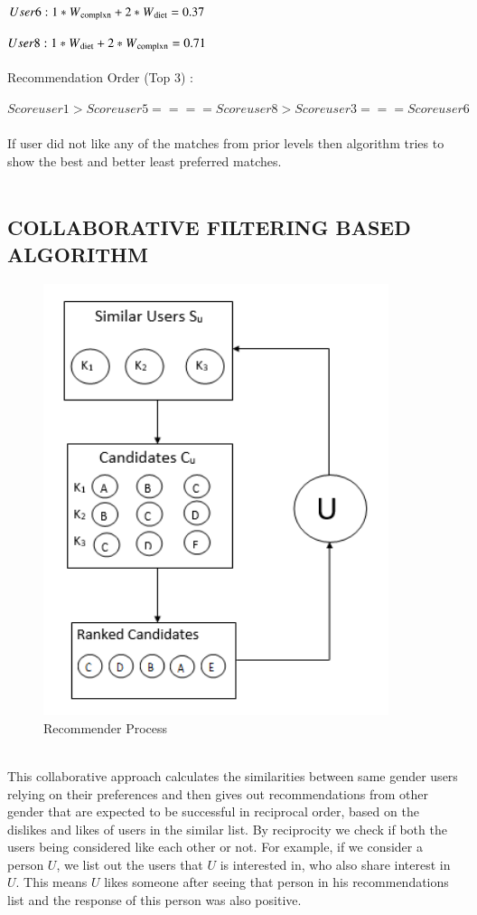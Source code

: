 \documentclass[12pt,oneside]{book}
\begin{document}
$User 6 : 1* W\textsubscript{complxn} + 2 * W\textsubscript{diet} = 0.37$

$User 8 : 1* W\textsubscript{diet} + 2 * W\textsubscript{complxn} = 0.71$\\\\
Recommendation Order (Top 3) :

$Scoreuser1 > Scoreuser5 ==== Scoreuser8  > Scoreuser3 === Scoreuser6$\\\\
If user did not like any of the matches from prior levels then algorithm tries to show the best and better least preferred matches. \\\\
\subsection{COLLABORATIVE FILTERING BASED ALGORITHM}
\begin{figure}[h]
    \centering
    \includegraphics[width=0.9\textwidth]{cfa}
    \caption{Recommender Process}
    \label{fig:cfa}
\end{figure}\\
This collaborative approach calculates the similarities between same gender users relying on their preferences and then gives out recommendations from other gender that are expected to be successful in reciprocal order, based on the dislikes and likes of users in the similar list. By reciprocity we check if both the users being considered like each other or not. For example, if we consider a person $U$, we list out the users that $U$ is interested in, who also share interest in $U$. This means $U$ likes someone after seeing that person in his recommendations list and the response of this person was also positive.
\end{document}
